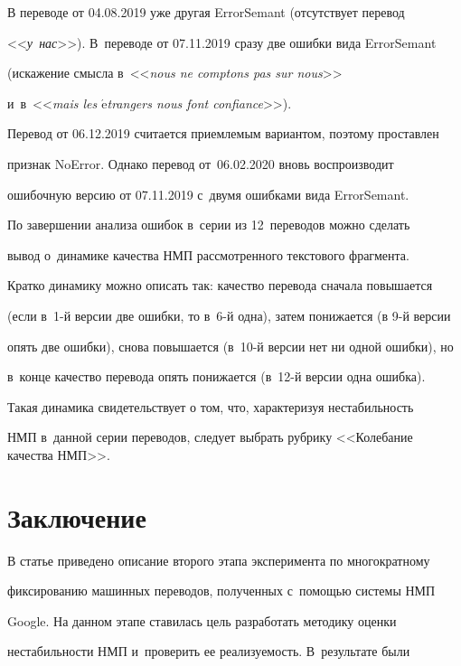   


  В переводе от 04.08.2019 уже другая ErrorSemant (отсутствует перевод 


<<\textit{у~нас}>>). В~переводе от 07.11.2019 сразу две ошибки вида ErrorSemant 


(искажение смысла в~<<\textit{nous ne comptons pas sur nous}>> 


и~в~<<\textit{mais les $\acute{\mbox{e}}$trangers nous font confiance}>>). 


Перевод от 06.12.2019 считается приемлемым вариантом, поэтому проставлен 


признак NoError. Однако перевод от~06.02.2020 вновь воспроизводит 


ошибочную версию от 07.11.2019 с~двумя ошибками вида ErrorSemant.


  


  По завершении анализа ошибок в~серии из 12~переводов можно сделать 


вывод о~динамике качества НМП рассмотренного текстового фрагмента. 


Кратко динамику можно описать так: качество перевода сначала повышается 


(если в~1-й версии две ошибки, то в~6-й одна), затем понижается (в 9-й версии 


опять две ошибки), снова повышается (в~10-й версии нет ни одной ошибки), но 


в~конце качество перевода опять понижается (в~12-й версии одна ошибка). 


Такая динамика свидетельствует о том, что, характеризуя нестабильность 


НМП в~данной серии переводов, следует выбрать рубрику <<Колебание качества НМП>>.





\section{Заключение}





  В статье приведено описание второго этапа эксперимента по многократному 


фиксированию машинных переводов, полученных с~по\-мощью системы НМП 


Google. На данном этапе ставилась цель разработать методику оценки 


нестабильности НМП и~проверить ее реализуемость. В~результате были 


